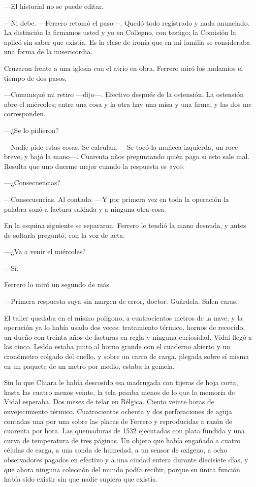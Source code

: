 ---El historial no se puede editar.

---Ni debe. ---Ferrero retomó el paso---. Quedó todo registrado y nada anunciado. La distinción la firmamos usted y yo en Collegno, con testigo; la Comisión la aplicó sin saber que existía. Es la clase de ironía que en mi familia se consideraba una forma de la misericordia.

Cruzaron frente a una iglesia con el atrio en obra. Ferrero miró los andamios el tiempo de dos pasos.

---Comuniqué mi retiro ---dijo---. Efectivo después de la ostensión. La ostensión abre el miércoles; entre una cosa y la otra hay una misa y una firma, y las dos me corresponden.

---¿Se lo pidieron?

---Nadie pide estas cosas. Se calculan. ---Se tocó la muñeca izquierda, un roce breve, y bajó la mano---. Cuarenta años preguntando quién paga si esto sale mal. Resulta que uno duerme mejor cuando la respuesta es «yo».

---¿Consecuencias?

---Consecuencias. Al contado. ---Y por primera vez en toda la operación la palabra sonó a factura saldada y a ninguna otra cosa.

En la esquina siguiente se separaron. Ferrero le tendió la mano desnuda, y antes de soltarla preguntó, con la voz de acta:

---¿Va a venir el miércoles?

---Sí.

Ferrero lo miró un segundo de más.

---Primera respuesta suya sin margen de error, doctor. Guárdela. Salen caras.


\scenebreak


El taller quedaba en el mismo polígono, a cuatrocientos metros de la nave, y la operación ya lo había usado dos veces: tratamiento térmico, hornos de recocido, un dueño con treinta años de facturas en regla y ninguna curiosidad. Vidal llegó a las cinco. Ledda estaba junto al horno grande con el cuaderno abierto y un cronómetro colgado del cuello, y sobre un carro de carga, plegada sobre sí misma en un paquete de un metro por medio, estaba la gemela.

Sin lo que Chiara le había descosido esa madrugada con tijeras de hoja corta, hasta las cuatro menos veinte, la tela pesaba menos de lo que la memoria de Vidal esperaba. Dos meses de telar en Bélgica. Ciento veinte horas de envejecimiento térmico. Cuatrocientas ochenta y dos perforaciones de aguja contadas una por una sobre las placas de Ferrero y reproducidas a razón de cuarenta por hora. Las quemaduras de 1532 ejecutadas con plata fundida y una curva de temperatura de tres páginas. Un objeto que había engañado a cuatro células de carga, a una sonda de humedad, a un sensor de oxígeno, a ocho observadores pagados en efectivo y a una ciudad entera durante diecisiete días, y que ahora ninguna colección del mundo podía recibir, porque su única función había sido existir sin que nadie supiera que existía.

